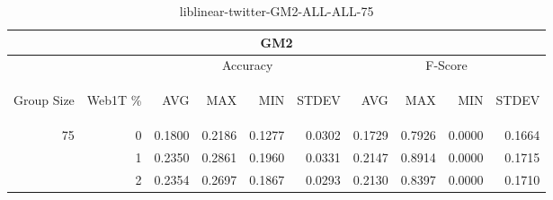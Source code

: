 \begin{center}
\begin{table}[htbp]
\begin{tabular}{ | r | r | r | r | r | r | r | r | r | r |}
\hline
\multicolumn{10}{|c|}{GM2}\\
\hline
 & & \multicolumn{4}{|c|}{Accuracy} & \multicolumn{4}{|c|}{F-Score}\\ \cline{3-10}
\begin{sideways}Group Size\end{sideways} & \begin{sideways}Web1T \%\end{sideways} & \begin{sideways}AVG\end{sideways} & \begin{sideways}MAX\end{sideways} & \begin{sideways}MIN\end{sideways} & \begin{sideways}STDEV\end{sideways} & \begin{sideways}AVG\end{sideways} & \begin{sideways}MAX\end{sideways} & \begin{sideways}MIN\end{sideways} & \begin{sideways}STDEV\end{sideways}\\
\hline
\multirow{2}{*}{75}
 & 0 & 0.1800 & 0.2186 & 0.1277 & 0.0302 & 0.1729 & 0.7926 & 0.0000 & 0.1664\\ \cline{2-10}
 & 1 & 0.2350 & 0.2861 & 0.1960 & 0.0331 & 0.2147 & 0.8914 & 0.0000 & 0.1715\\ \cline{2-10}
 & 2 & 0.2354 & 0.2697 & 0.1867 & 0.0293 & 0.2130 & 0.8397 & 0.0000 & 0.1710\\ \cline{2-10}
\hline
\end{tabular}
\caption{liblinear-twitter-GM2-ALL-ALL-75}
\label{table:liblinear-twitter-GM2-ALL-ALL-75}
\end{table}
\end{center}

